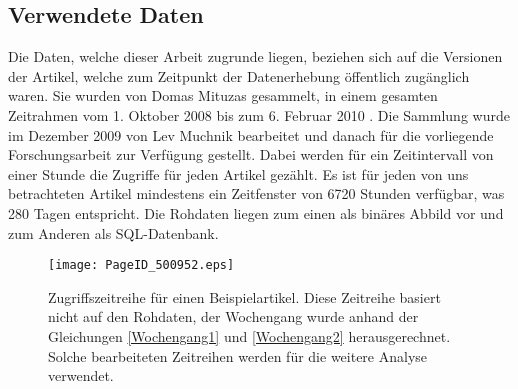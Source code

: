 \documentclass[fontsize=11pt, twoside, a4paper]{scrartcl}
\begin{document}
\subsection{Verwendete Daten}
Die Daten, welche dieser Arbeit zugrunde liegen, beziehen sich auf die Versionen der Artikel, welche zum Zeitpunkt der Datenerhebung öffentlich zugänglich waren. Sie wurden von Domas Mituzas gesammelt, in einem gesamten Zeitrahmen vom 1. Oktober 2008 bis zum 6. Februar 2010 \cite{DomasMituzas}. Die Sammlung wurde im Dezember 2009 von Lev Muchnik bearbeitet und danach für die vorliegende Forschungsarbeit zur Verfügung gestellt. Dabei werden für ein Zeitintervall von einer Stunde die Zugriffe für jeden Artikel gezählt. Es ist für jeden von uns betrachteten Artikel mindestens ein Zeitfenster von 6720 Stunden verfügbar, was 280 Tagen entspricht. Die Rohdaten liegen zum einen als binäres Abbild vor und zum Anderen als SQL-Datenbank.
\begin{figure}[H]
\centering
	\texttt{[image: PageID\_500952.eps]}
	\caption{Zugriffszeitreihe für einen Beispielartikel. Diese Zeitreihe basiert nicht auf den Rohdaten, der Wochengang wurde anhand der Gleichungen \ref{Wochengang1} und \ref{Wochengang2} herausgerechnet. Solche bearbeiteten Zeitreihen werden für die weitere Analyse verwendet.}
\end{figure}
\end{document}
